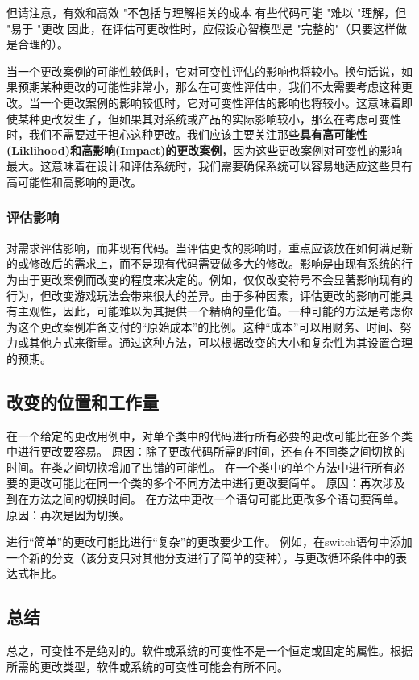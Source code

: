 \documentclass[]{ctexbook}
\begin{document}
但请注意，有效和高效 "不包括与理解相关的成本
有些代码可能 "难以 "理解，但 "易于 "更改
因此，在评估可更改性时，应假设心智模型是 "完整的"（只要这样做是合理的）。

当一个更改案例的可能性较低时，它对可变性评估的影响也将较小。换句话说，如果预期某种更改的可能性非常小，那么在可变性评估中，我们不太需要考虑这种更改。当一个更改案例的影响较低时，它对可变性评估的影响也将较小。这意味着即使某种更改发生了，但如果其对系统或产品的实际影响较小，那么在考虑可变性时，我们不需要过于担心这种更改。我们应该主要关注那些\textbf{具有高可能性(Liklihood)和高影响(Impact)的更改案例}，因为这些更改案例对可变性的影响最大。这意味着在设计和评估系统时，我们需要确保系统可以容易地适应这些具有高可能性和高影响的更改。

\subsubsection{评估影响}
对需求评估影响，而非现有代码。当评估更改的影响时，重点应该放在如何满足新的或修改后的需求上，而不是现有代码需要做多大的修改。影响是由现有系统的行为由于更改案例而改变的程度来决定的。例如，仅仅改变符号不会显著影响现有的行为，但改变游戏玩法会带来很大的差异。由于多种因素，评估更改的影响可能具有主观性，因此，可能难以为其提供一个精确的量化值。一种可能的方法是考虑你为这个更改案例准备支付的“原始成本”的比例。这种“成本”可以用财务、时间、努力或其他方式来衡量。通过这种方法，可以根据改变的大小和复杂性为其设置合理的预期。

\subsection{改变的位置和工作量}
在一个给定的更改用例中，对单个类中的代码进行所有必要的更改可能比在多个类中进行更改要容易。
原因：除了更改代码所需的时间，还有在不同类之间切换的时间。在类之间切换增加了出错的可能性。
在一个类中的单个方法中进行所有必要的更改可能比在同一个类的多个不同方法中进行更改要简单。
原因：再次涉及到在方法之间的切换时间。
在方法中更改一个语句可能比更改多个语句要简单。
原因：再次是因为切换。

进行“简单”的更改可能比进行“复杂”的更改要少工作。
例如，在switch语句中添加一个新的分支（该分支只对其他分支进行了简单的变种），与更改循环条件中的表达式相比。

\subsection{总结}
总之，可变性不是绝对的。软件或系统的可变性不是一个恒定或固定的属性。根据所需的更改类型，软件或系统的可变性可能会有所不同。
\end{document}
